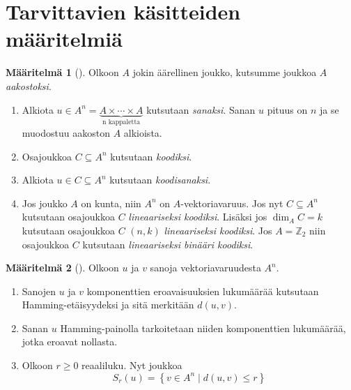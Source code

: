 \documentclass[a4paper,12pt,leqno,oneside]{report} %
\theoremstyle{plain}
\newtheorem{lause}{Lause}[chapter]
\theoremstyle{definition}
\newtheorem{maaritelma}{Määritelmä}[chapter]
\theoremstyle{remark}
\numberwithin{equation}{chapter}
\newcommand*{\Zset}{\mathbb{Z}}  %
\begin{document}
    \section{Tarvittavien käsitteiden määritelmiä}
    \begin{maaritelma}[{\cite[s.~491]{PA}}]
        Olkoon $A$ jokin äärellinen joukko, kutsumme joukkoa $A$ \emph{aakostoksi}.

        \begin{enumerate}
            \item Alkiota $u \in  A^n = \underbrace{A \times \cdots \times A}_{\text{n kappaletta}}$ kutsutaan \emph{sanaksi}. Sanan $u$ pituus on $n$ ja se muodostuu aakoston $A$ alkioista.
            \item Osajoukkoa $C \subseteq A^n$ kutsutaan \emph{koodiksi}.
            \item Alkiota $u \in C \subseteq A^n$ kutsutaan \emph{koodisanaksi}.
            \item Jos joukko $A$ on kunta, niin $A^n$ on $A$-vektoriavaruus. Jos nyt $C \subseteq A^n$ kutsutaan osajoukkoa $C$ \emph{lineaariseksi koodiksi}. Lisäksi jos $\dim_A C = k$ kutsutaan osajoukkoa $C$ $(n, k)$ \emph{lineaariseksi koodiksi}. Jos $A = \Zset_2$ niin osajoukkoa $C$ kutsutaan \emph{lineaariseksi binääri koodiksi}.
        \end{enumerate}
    \end{maaritelma}




\begin{maaritelma}[{\cite[s.~492]{PA}}]
    Olkoon $u$ ja $v$ sanoja vektoriavaruudesta $A^n$.
    \begin{enumerate}
        \item Sanojen $u$ ja $v$ komponenttien eroavaisuuksien lukumäärää kutsutaan Hamming-etäisyydeksi ja sitä merkitään $d(u,v)$.
        \item Sanan $u$ Hamming-painolla tarkoitetaan niiden komponenttien lukumäärää, jotka eroavat nollasta.
        \item Olkoon $r\ge0$ reaaliluku. Nyt joukkoa
            \[
                S_r\left(u\right) = \left\{v \in A^n \mid d\left(u, v\right) \le r \right\}
            \]
    \end{enumerate}
\end{maaritelma}
\end{document}
